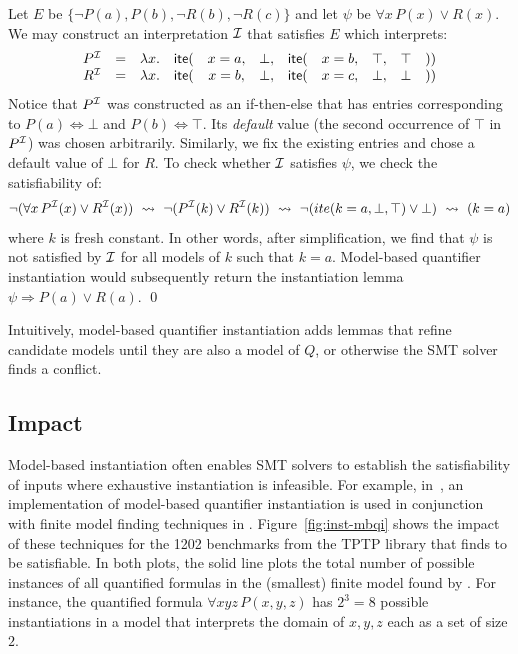 \documentclass[oribibl]{llncs}
\begin{document}
\begin{example}
Let $E$ be $\{ \neg P( a ), P( b ), \neg R( b ), \neg R( c ) \}$ and let $\psi$ be $\forall x\, P( x ) \vee R( x )$.
We may construct an interpretation $\mathcal{I}$ that satisfies $E$ which interprets:
\[
\begin{array}{rcccccccccc}
P^{\mathcal{I}} & = & \lambda x. & \mathsf{ite}( & x=a, & \bot, & \mathsf{ite}( & x=b, & \top, & \top  & )) \\
R^{\mathcal{I}} & = & \lambda x. & \mathsf{ite}( & x=b, & \bot, & \mathsf{ite}( & x=c, & \bot, & \bot  & )) \\
\end{array}
\]
Notice that $P^{\mathcal{I}}$ was constructed as an if-then-else that has entries corresponding to $P( a ) \Leftrightarrow \bot$
and $P( b ) \Leftrightarrow \top$. Its \emph{default} value (the second occurrence of $\top$ in $P^{\mathcal{I}}$) was chosen arbitrarily.
Similarly, we fix the existing entries and chose a default value of $\bot$ for $R$.
To check whether $\mathcal{I}$ satisfies $\psi$, we check the satisfiability of:
\[
\neg ( \forall x\, P^{\mathcal{I}}( x ) \vee R^{\mathcal{I}}( x ) ) \ \leadsto \  \neg ( P^{\mathcal{I}}( k ) \vee R^{\mathcal{I}}( k ) ) \ \leadsto \  \neg ( ite( k=a, \bot, \top) \vee \bot ) \ \leadsto \  ( k = a )
\]
where $k$ is fresh constant.
In other words, after simplification, we find that $\psi$ is not satisfied by $\mathcal{I}$ for all models of $k$ such that $k = a$.
Model-based quantifier instantiation would subsequently return the instantiation lemma $\psi \Rightarrow P( a ) \vee R( a )$.
\qed
\end{example}
Intuitively,
model-based quantifier instantiation adds lemmas that refine candidate models
until they are also a model of $Q$, or otherwise the SMT solver finds a conflict.


\subsection{Impact}
Model-based instantiation often enables SMT solvers to
establish the satisfiability of inputs where exhaustive instantiation is infeasible.
For example,
in~\cite{}, an implementation of model-based quantifier instantiation is used
in conjunction with finite model finding techniques in \cvc.
Figure~\ref{fig:inst-mbqi} shows the impact of these techniques for the 1202
benchmarks from the TPTP library that \cvc finds to be satisfiable.
In both plots, the solid line plots the total number of possible instances of all quantified formulas
in the (smallest) finite model found by \cvc.
For instance, the quantified formula $\forall xyz\, P( x, y, z )$ has $2^3 = 8$ possible instantiations
in a model that interprets the domain of $x,y,z$ each as a set of size $2$.
\end{document}

